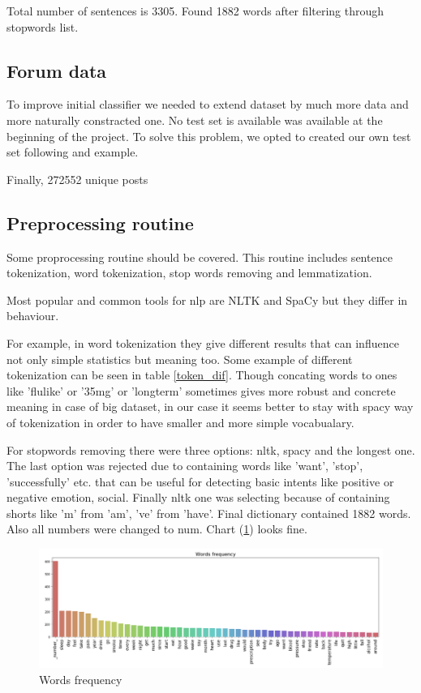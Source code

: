 \documentclass[11pt]{article}
\begin{document}
Total number of sentences is 3305. Found 1882 words after filtering through stopwords list. 

\subsection{Forum data}

To improve initial classifier we needed to extend dataset by much more
data and more naturally constracted one. No test set is available was
available at the beginning of the project. To solve this problem, we
opted to created our own test set following \cite{zhang2015} and
\cite{sondhi-EtAl:2010:POSTERS} example.

Finally, 272552 unique posts


\subsection{Preprocessing routine}

Some proprocessing routine should be covered. This routine includes sentence tokenization, word tokenization, stop words removing and lemmatization. 

Most popular and common tools for nlp are NLTK and SpaCy but they differ in behaviour.


For example, in word tokenization they give different results that can influence not only simple statistics but meaning too. Some example of different tokenization can be seen in table \ref{token_dif}. Though concating words to ones like 'flulike' or '35mg' or 'longterm' sometimes gives more robust and concrete meaning in case of big dataset, in our case it seems better to stay with spacy way of tokenization in order to have smaller and more simple vocabualary.

For stopwords removing there were three options: nltk, spacy and the longest one. The last option was rejected due to containing words like 'want', 'stop', 'successfully' etc. that can be useful for detecting basic intents like positive or negative emotion, social. Finally nltk one was selecting because of containing shorts like 'm' from 'am', 've' from 'have'. Final dictionary contained 1882 words. Also all numbers were changed to num. Chart (\ref{words_freq}) looks fine.

 \begin{figure}[h]
 	\centering
 	\includegraphics[scale=0.4]{report2.png}
	\caption{Words frequency}
 \label{words_freq}
 \end{figure}
\end{document}
